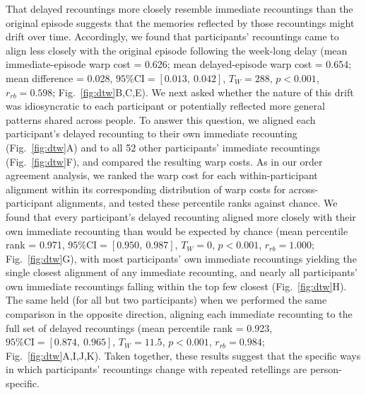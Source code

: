 \documentclass[10pt]{article}
\begin{document}
That delayed recountings more closely resemble immediate recountings than the original episode suggests that the memories reflected by those recountings might drift over time.
Accordingly, we found that participants' recountings came to align less closely with the original episode following the week-long delay (mean immediate-episode warp cost = 0.626; mean delayed-episode warp cost = 0.654; mean difference = 0.028, $\text{95\% CI} = \left[0.013,~0.042\right]$, $T_W = 288$, $p < 0.001$, $r_{rb} = 0.598$; Fig.~\ref{fig:dtw}B,C,E).
We next asked whether the nature of this drift was idiosyncratic to each participant or potentially reflected more general patterns shared across people.
To answer this question, we aligned each participant's delayed recounting to their own immediate recounting (Fig.~\ref{fig:dtw}A) and to all 52 other participants' immediate recountings (Fig.~\ref{fig:dtw}F), and compared the resulting warp costs.
As in our order agreement analysis, we ranked the warp cost for each within-participant alignment within its corresponding distribution of warp costs for across-participant alignments, and tested these percentile ranks against chance.
We found that every participant's delayed recounting aligned more closely with their own immediate recounting than would be expected by chance (mean percentile rank = 0.971, $\text{95\% CI} = \left[0.950,~0.987\right]$, $T_W = 0$, $p < 0.001$, $r_{rb} = 1.000$; Fig.~\ref{fig:dtw}G), with most participants' own immediate recountings yielding the single closest alignment of any immediate recounting, and nearly all participants' own immediate recountings falling within the top few closest (Fig.~\ref{fig:dtw}H).
The same held (for all but two participants) when we performed the same comparison in the opposite direction, aligning each immediate recounting to the full set of delayed recountings (mean percentile rank = 0.923, $\text{95\% CI} = \left[0.874,~0.965\right]$, $T_W = 11.5$, $p < 0.001$, $r_{rb} = 0.984$; Fig.~\ref{fig:dtw}A,I,J,K).
Taken together, these results suggest that the specific ways in which participants' recountings change with repeated retellings are person-specific.
\end{document}
